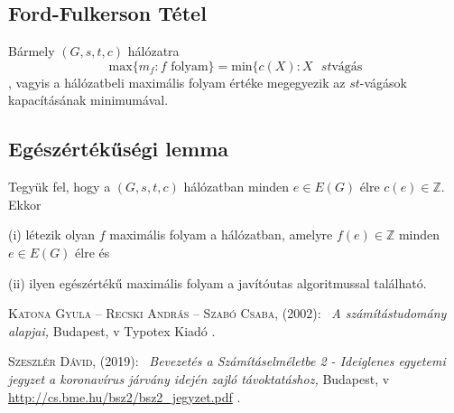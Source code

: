 \documentclass[12pt,a4paper,twoside]{report}
\newcommand{\bibentry}[7]{
	{\textsc{#1}}%
	{#2}:~%
	{\textit{#3}}%
	{#4}%
v	{#5}%
	{#6}%
	{#7}.%
}
\begin{document}
\subsection{Ford-Fulkerson Tétel}
Bármely $(G,s,t,c)$ hálózatra
$$\text{max}\{m_f:f\text{ folyam}\} = \text{min} \{ c(X):X\text{ }st\text{vágás}$$,
vagyis a hálózatbeli maximális folyam értéke megegyezik az $st$-vágások kapacításának minimumával.
\subsection{Egészértékűségi lemma}
Tegyük fel, hogy a $(G, s,t, c)$ hálózatban minden $e\in E(G)$ élre $c(e)\in\mathbb{Z}$. Ekkor

(i) létezik olyan $f$ maximális folyam a hálózatban, amelyre $f (e)\in\mathbb{Z}$ minden
$e\in E(G)$ élre és

(ii) ilyen egészértékű maximális folyam a javítóutas algoritmussal található.
\clearpage
\begin{thebibliography}{99}
\bibentry{Katona Gyula – Recski András – Szabó Csaba, }{(2002)}{A számítástudomány alapjai, }{Budapest, }{Typotex Kiadó}{}{}

\bibentry{Szeszlér Dávid, }{(2019)}{Bevezetés a Számításelméletbe 2 - Ideiglenes egyetemi jegyzet a koronavírus járvány idején zajló távoktatáshoz, }{Budapest, }{\url{http://cs.bme.hu/bsz2/bsz2_jegyzet.pdf}}{}{}
\end{thebibliography}
\end{document}
